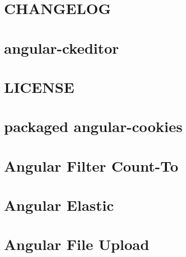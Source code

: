\documentclass[twoside]{book}
\newcommand{\+}{\discretionary{\mbox{\scriptsize$\hookleftarrow$}}{}{}}
\begin{document}
\chapter{C\+H\+A\+N\+G\+E\+L\+OG}
\label{md_app_web_bower_components_angular-ckeditor__c_h_a_n_g_e_l_o_g}

\chapter{angular-\/ckeditor}
\label{md_app_web_bower_components_angular-ckeditor__r_e_a_d_m_e}

\chapter{L\+I\+C\+E\+N\+SE}
\label{md_app_web_bower_components_angular-cookies__l_i_c_e_n_s_e}

\chapter{packaged angular-\/cookies}
\label{md_app_web_bower_components_angular-cookies__r_e_a_d_m_e}

\chapter{Angular Filter Count-\/\+To}
\label{md_app_web_bower_components_angular-count-to-0_81_81__r_e_a_d_m_e}

\chapter{Angular Elastic}
\label{md_app_web_bower_components_angular-elastic__r_e_a_d_m_e}

\chapter{Angular File Upload}
\label{md_app_web_bower_components_angular-file-upload__r_e_a_d_m_e}

\end{document}
